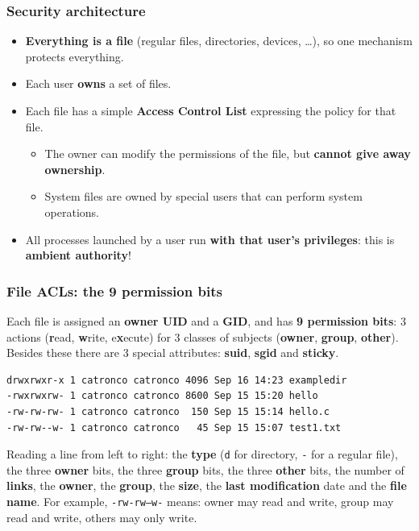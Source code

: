 \subsubsection{Security architecture}

\begin{itemize}
    \item \textbf{Everything is a file} (regular files, directories, devices, \dots), so one mechanism protects everything.
    \item Each user \textbf{owns} a set of files.
    \item Each file has a simple \textbf{Access Control List} expressing the policy for that file.
    \begin{itemize}
        \item The owner can modify the permissions of the file, but \textbf{cannot give away ownership}.
        \item System files are owned by special users that can perform system operations.
    \end{itemize}
    \item All processes launched by a user run \textbf{with that user's privileges}: this is \textbf{ambient authority}!
\end{itemize}

\subsubsection{File ACLs: the 9 permission bits}

Each file is assigned an \textbf{owner UID} and a \textbf{GID}, and has \textbf{9 permission bits}: 3 actions (\textbf{r}ead, \textbf{w}rite, e\textbf{x}ecute) for 3 classes of subjects (\textbf{owner}, \textbf{group}, \textbf{other}). Besides these there are 3 special attributes: \textbf{suid}, \textbf{sgid} and \textbf{sticky}.

\begin{verbatim}
drwxrwxr-x 1 catronco catronco 4096 Sep 16 14:23 exampledir
-rwxrwxrw- 1 catronco catronco 8600 Sep 15 15:20 hello
-rw-rw-rw- 1 catronco catronco  150 Sep 15 15:14 hello.c
-rw-rw--w- 1 catronco catronco   45 Sep 15 15:07 test1.txt
\end{verbatim}

Reading a line from left to right: the \textbf{type} (\texttt{d} for directory, \texttt{-} for a regular file), the three \textbf{owner} bits, the three \textbf{group} bits, the three \textbf{other} bits, the number of \textbf{links}, the \textbf{owner}, the \textbf{group}, the \textbf{size}, the \textbf{last modification} date and the \textbf{file name}. For example, \texttt{-rw-rw--w-} means: owner may read and write, group may read and write, others may only write.

